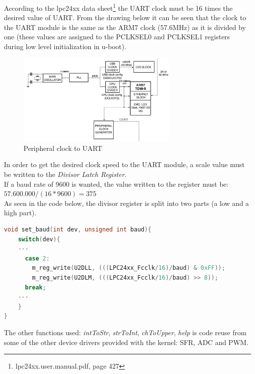 According to the lpc24xx data sheet\footnote{lpc24xx.user.manual.pdf, page 427} the UART clock must be 16 times the desired value of UART. From the drawing below it can be seen that the clock to the UART module is the same as the ARM7 clock (57.6MHz) as it is divided by one (these values are assigned to the PCLKSEL0 and PCLKSEL1 registers during low level initialization in u-boot). 
\begin{figure}[H]
	\begin{centering}
		\includegraphics[width=0.7\textwidth]{images/peripheral_clock_gen.png}
		\caption{Peripheral clock to UART}
	\end{centering}
\end{figure}
In order to get the desired clock speed to the UART module, a scale value must be written to the \textit{Divisor Latch Register}.
\\If a baud rate of 9600 is wanted, the value written to the register must be: \\$57.600.000/(16*9600)=375$
\\As seen in the code below, the divisor register is split into two parts (a low and a high part).
\begin{lstlisting}[language=c]
void set_baud(int dev, unsigned int baud){
	switch(dev){
	---
	  case 2:
	    m_reg_write(U2DLL, (((LPC24xx_Fcclk/16)/baud) & 0xFF));
	    m_reg_write(U2DLM, (((LPC24xx_Fcclk/16)/baud) >> 8));
	  break;
	---
	}
}
\end{lstlisting}



The other functions used: \textit{intToStr}, \textit{strToInt}, \textit{chToUpper}, \textit{help} is code reuse from some of the other device drivers provided with the kernel: SFR, ADC and PWM.

%
